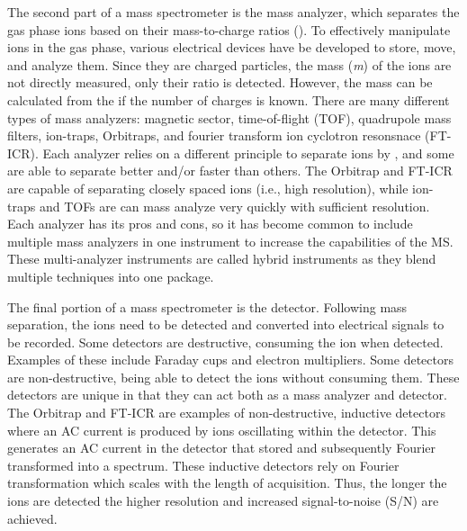 The second part of a mass spectrometer is the mass analyzer, which separates the gas phase ions based on their mass-to-charge ratios (\mz{}). To effectively manipulate ions in the gas phase, various electrical devices have be developed to store, move, and analyze them. Since they are charged particles, the mass (\emph{m}) of the ions are not directly measured, only their \mz{} ratio is detected. However, the mass can be calculated from the \mz{} if the number of charges is known. There are many different types of mass analyzers: magnetic sector, time-of-flight (TOF)\cite{tof}, quadrupole mass filters\cite{iontrap}, ion-traps\cite{iontrap2}, Orbitraps\cite{orbitrap}, and fourier transform ion cyclotron resonsnace (FT-ICR)\cite{fticr}. Each analyzer relies on a different principle to separate ions by \mz{}, and some are able to separate better and/or faster than others. The Orbitrap and FT-ICR are capable of separating closely spaced \mz{} ions (i.e., high resolution), while ion-traps and TOFs are can mass analyze very quickly with sufficient resolution. Each analyzer has its pros and cons, so it has become common to include multiple mass analyzers in one instrument to increase the capabilities of the MS. These multi-analyzer instruments are called hybrid instruments as they blend multiple techniques into one package.

The final portion of a mass spectrometer is the detector. Following mass separation, the ions need to be detected and converted into electrical signals to be recorded. Some detectors are destructive, consuming the ion when detected. Examples of these include Faraday cups and electron multipliers. Some detectors are non-destructive, being able to detect the ions without consuming them. These detectors are unique in that they can act both as a mass analyzer and detector. The Orbitrap and FT-ICR are examples of non-destructive, inductive detectors where an AC current is produced by ions oscillating within the detector. This generates an AC current in the detector that stored and subsequently Fourier transformed into a \mz{} spectrum. These inductive detectors rely on Fourier transformation which scales with the length of acquisition. Thus, the longer the ions are detected the higher resolution and increased signal-to-noise (S/N) are achieved.

